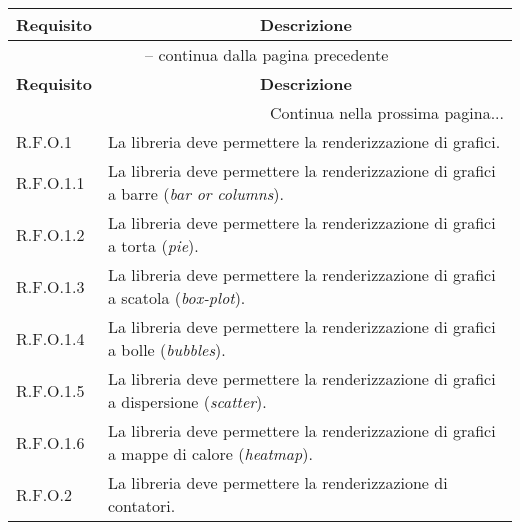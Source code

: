 \begin{center}
    \begin{longtable}{|p{2.5cm}|p{10cm}|}
        \hline
        \rowcolor{gray!30}
        \textbf{Requisito} & \multicolumn{1}{c|}{\textbf{Descrizione}}                                                                 \\
        \hline
        \endfirsthead
        \hline
        \multicolumn{2}{|c|}{{\tablename\ \thetable{} -- continua dalla pagina precedente}}                                            \\
        \hline
        \rowcolor{gray!30}
        \textbf{Requisito} & \multicolumn{1}{c|}{\textbf{Descrizione}}                                                                 \\
        \endhead
        \hline
        \multicolumn{2}{|r|}{{Continua nella prossima pagina...}}                                                                      \\
        \hline
        \endfoot
        \hline
        \endlastfoot
        R.F.O.1            & La libreria deve permettere la renderizzazione di grafici.                                                \\
        \hline
        R.F.O.1.1          & La libreria deve permettere la renderizzazione di grafici a barre (\textit{bar or columns}).              \\
        \hline
        R.F.O.1.2          & La libreria deve permettere la renderizzazione di grafici a torta (\textit{pie}).                         \\
        \hline
        R.F.O.1.3          & La libreria deve permettere la renderizzazione di grafici a scatola (\textit{box-plot}).                  \\
        \hline
        R.F.O.1.4          & La libreria deve permettere la renderizzazione di grafici a bolle (\textit{bubbles}).                     \\
        \hline
        R.F.O.1.5          & La libreria deve permettere la renderizzazione di grafici a dispersione (\textit{scatter}).               \\
        \hline
        R.F.O.1.6          & La libreria deve permettere la renderizzazione di grafici a mappe di calore (\textit{heatmap}).           \\
        \hline
        R.F.O.2            & La libreria deve permettere la renderizzazione di contatori.                                              \\

\end{longtable}
\end{center}
